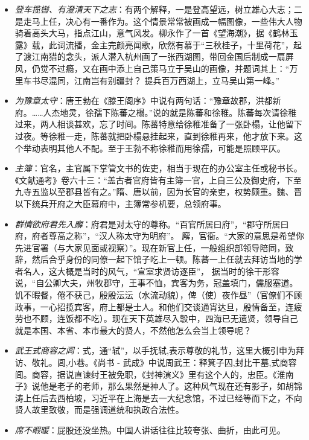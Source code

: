 \documentclass[]{book}
\begin{document}
\begin{itemize}
\item
  \emph{登车揽辔、有澄清天下之志}：有两个解释，一是登高望远，树立雄心大志；二是走马上任，决心有一番作为。这个情景常常被画成一幅图像，一些伟大人物骑着高头大马，指点江山，意气风发。柳永作了一首《望海潮》，据《鹤林玉露》载，此词流播，金主完颜亮闻歌，欣然有慕于``三秋桂子，十里荷花''，起了渡江南猎的念头，派人潜入杭州画了一张西湖图，带回金国后制成一扇屏风，仍觉不过瘾，又在画中添上自己策马立于吴山的画像，并题词其上：``万里车书尽混同，江南岂有别疆封？
  提兵百万西湖上，立马吴山第一峰。''
\item
  \emph{为豫章太守}：唐王勃在《滕王阁序》中说有两句话：``豫章故郡，洪都新府。\ldots{}\ldots{}人杰地灵，徐孺下陈蕃之榻。''说的就是陈蕃和徐稚。陈蕃每次请徐稚过来，两人相谈甚欢，忘了时间。陈蕃特意给徐稚准备了一张卧榻，让他留下过夜。等徐稚一走，陈蕃就把卧榻悬挂起来，直到徐稚再来，他才放下来。这个举动表明其他人不配。至于王勃不称徐稚而用徐孺，可能是照顾平仄。
\item
  \emph{主簿}：官名，主官属下掌管文书的佐吏，相当于现在的办公室主任或秘书长。《文献通考》卷六十三：``盖古者官府皆有主簿一官，上自三公及御史府，下至九寺五监以至郡县皆有之。''隋、唐以前，因为长官的亲吏，权势颇重。魏、晋以下统兵开府之大臣幕府中，主簿常参机要，总领府事。
\item
  \emph{群情欲府君先入廨}：府君是对太守的尊称。``百官所居曰府''，``郡守所居曰府，府者尊高之称''，``汉人称太守为明府''。
  廨，官衙。``大家的意思是希望你先进官署（与大家见面或视察）''。现在新官上任，一般组织部领导陪同，致辞，然后合乎身份的同僚一起下馆子吃上一顿。陈蕃一上任就去拜访当地的学者名人，这大概是当时的风气，``宣室求贤访逐臣''，
  据当时的徐干形容说，``自公卿大夫，州牧郡守，王事不恤，宾客为务，冠盖填门，儒服塞道。饥不暇餐，倦不获己，殷殷沄沄（水流动貌），俾（使）夜作昼''（官僚们不顾政事，一心招揽宾客，府上都是士人。和他们交谈通宵达旦，殷情备至，连疲劳也不顾，连饭都不吃）。现在天下英雄尽入彀中，四海已无遗贤，领导自己就是本国、本省、本市最大的贤人，不然他怎么会当上领导呢？
\item
  \emph{武王式商容之闾}：式，通``轼''，以手抚轼,表示尊敬的礼节，这里大概引申为拜访、敬礼。闾,小巷。《尚书
  -
  武成》中说周武王：释箕子囚,封比干墓,式商容闾。商容，据说直谏纣王被免职，《封神演义》里有这个人的，忠臣。《淮南子》说他是老子的老师，那么果然是神人了。这种风气现在还有影子，如胡锦涛上任后去西柏坡，习近平在上海是去一大纪念馆，不过已经等而下之，不向贤人故里致敬，而是强调道统和执政合法性。
\item
  \emph{席不暇暖}：屁股还没坐热。中国人讲话往往比较夸张、曲折，由此可见。
\end{itemize}
\end{document}
